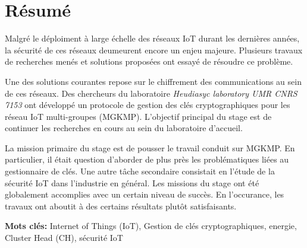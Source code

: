 \chapter*{Résumé}

Malgré le déploiment à large échelle des réseaux IoT durant les dernières années, la sécurité de ces réseaux deumeurent encore un enjeu majeure. Plusieurs travaux de recherches menés et solutions proposées ont essayé de résoudre ce problème.

Une des solutions courantes repose sur le chiffrement des communications au sein de ces réseaux. Des chercheurs du laboratoire \emph{Heudiasyc laboratory UMR CNRS 7153} ont développé un protocole de gestion des clés cryptographiques pour les réseau IoT multi-groupes (MGKMP). L'objectif principal du stage est de continuer les recherches en cours au sein du laboratoire d'accueil.

La mission primaire du stage est de pousser le travail conduit sur MGKMP. En particulier, il était question d'aborder de plus près les problématiques liées au gestionnaire de clés. Une autre tâche secondaire consistait en l'étude de la sécurité IoT dans l'industrie en général. Les missions du stage ont été globalement accomplies avec un certain niveau de succès. En l'occurance, les travaux ont aboutit à des certains résultats plutôt satisfaisants.

\textbf{Mots clés:} Internet of Things (IoT), Gestion de clés cryptographiques, energie, Cluster Head (CH), sécurité IoT